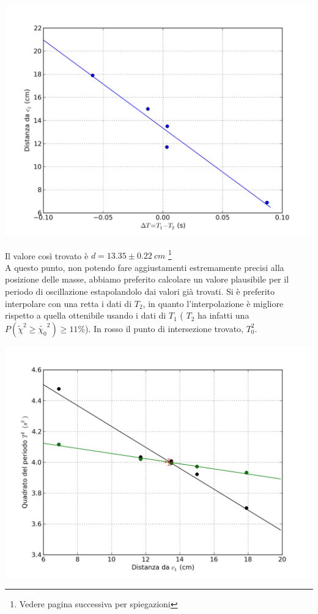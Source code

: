 \begin{center}
\includegraphics[scale=0.60]{../grafici/kater/intercetta.png}
\end{center}
Il valore così trovato è $d = 13.35 \pm 0.22\ cm$ \footnote{Vedere pagina successiva per spiegazioni}
\\
A questo punto, non potendo fare aggiustamenti estremamente precisi alla posizione delle masse, abbiamo preferito calcolare un valore plausibile per il periodo di oscillazione estapolandolo dai valori già trovati. Si è preferito interpolare con una retta i dati di  $T_2$, in quanto l'interpolazione è migliore rispetto a quella ottenibile usando i dati di $T_1$ ( $T_2$ ha infatti una $P(\tilde{\chi}^2 \geq \tilde{\chi_0}^2) \geq 11\%$).
In rosso il punto di intersezione trovato, $T^2_0$.

\begin{center}
\includegraphics[scale=0.70]{../grafici/kater/intersezione.png}
\end{center}

